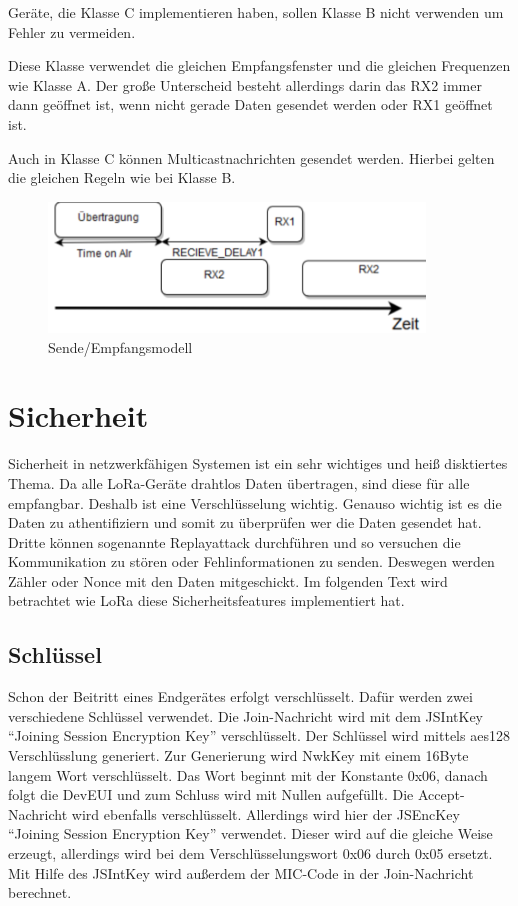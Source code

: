 \documentclass[a4paper, 12pt]{article}
\begin{document}
            Geräte, die Klasse C implementieren haben, sollen Klasse B nicht verwenden um Fehler zu vermeiden.

            Diese Klasse verwendet die gleichen Empfangsfenster und die gleichen Frequenzen wie Klasse A. Der große 
            Unterscheid besteht allerdings darin das RX2 immer dann geöffnet ist, wenn nicht gerade Daten gesendet 
            werden oder RX1 geöffnet ist. 

            Auch in Klasse C können Multicastnachrichten gesendet werden. Hierbei gelten die gleichen 
            Regeln wie bei Klasse B.


            \begin{figure}[ht]
                \centering
                \includegraphics[width=10cm]{KlasseC}
                \caption{Sende/Empfangsmodell}
            \end{figure}

    \section{Sicherheit} \label{sec:Sicherheit}  
        Sicherheit in netzwerkfähigen Systemen ist ein sehr wichtiges und heiß disktiertes Thema. Da alle LoRa-Geräte 
        drahtlos Daten übertragen, sind diese für alle empfangbar. Deshalb ist eine Verschlüsselung wichtig.
        Genauso wichtig ist es die Daten zu athentifiziern und somit zu überprüfen wer die Daten gesendet hat. 
        Dritte können sogenannte Replayattack durchführen und so versuchen die Kommunikation zu stören oder 
        Fehlinformationen zu senden. Deswegen werden Zähler oder Nonce mit den Daten mitgeschickt. 
        Im folgenden Text wird betrachtet wie LoRa diese Sicherheitsfeatures implementiert hat.

        \subsection{Schlüssel}
            Schon der Beitritt eines Endgerätes erfolgt verschlüsselt. Dafür werden zwei verschiedene Schlüssel 
            verwendet. Die Join-Nachricht wird mit dem JSIntKey ``Joining Session Encryption Key'' verschlüsselt. Der 
            Schlüssel wird mittels aes128 Verschlüsslung generiert. 
            Zur Generierung wird NwkKey mit einem 16Byte langem Wort verschlüsselt. Das Wort beginnt 
            mit der Konstante 0x06, danach folgt die DevEUI und zum Schluss wird mit Nullen aufgefüllt. 
            Die Accept-Nachricht wird ebenfalls verschlüsselt. Allerdings wird 
            hier der JSEncKey ``Joining Session Encryption Key'' verwendet. Dieser wird auf die gleiche Weise erzeugt, 
            allerdings wird bei dem Verschlüsselungswort 0x06 durch 0x05 ersetzt. 
            Mit Hilfe des JSIntKey wird außerdem der MIC-Code in der Join-Nachricht berechnet.
\end{document}
